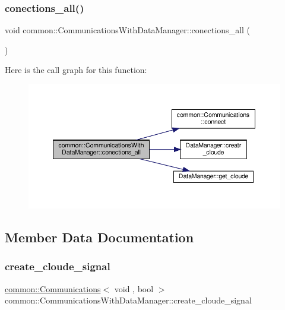 \subsubsection{\texorpdfstring{conections\+\_\+all()}{conections\_all()}}
{\footnotesize\ttfamily void common\+::\+Communications\+With\+Data\+Manager\+::conections\+\_\+all (\begin{DoxyParamCaption}{ }\end{DoxyParamCaption})\hspace{0.3cm}{\ttfamily [inline]}}

Here is the call graph for this function\+:
\nopagebreak
\begin{figure}[H]
\begin{center}
\leavevmode
\includegraphics[width=350pt]{classcommon_1_1CommunicationsWithDataManager_af065d105c9e14c175a07c2034b1441de_cgraph}
\end{center}
\end{figure}


\subsection{Member Data Documentation}
\mbox{\label{classcommon_1_1CommunicationsWithDataManager_a228466f92772aa4a499d42d74e44fa3f}} 
\subsubsection{\texorpdfstring{create\+\_\+cloude\+\_\+signal}{create\_cloude\_signal}}
{\footnotesize\ttfamily \mbox{\hyperlink{classcommon_1_1Communications}{common\+::\+Communications}}$<$ void , bool $>$ common\+::\+Communications\+With\+Data\+Manager\+::create\+\_\+cloude\+\_\+signal}

